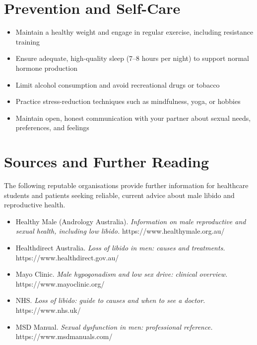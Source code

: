 \section*{Prevention and Self-Care}
\begin{itemize}
    \item Maintain a healthy weight and engage in regular exercise, including resistance training
    \item Ensure adequate, high-quality sleep (7--8 hours per night) to support normal hormone production
    \item Limit alcohol consumption and avoid recreational drugs or tobacco
    \item Practice stress-reduction techniques such as mindfulness, yoga, or hobbies
    \item Maintain open, honest communication with your partner about sexual needs, preferences, and feelings
\end{itemize}

\section*{Sources and Further Reading}
The following reputable organisations provide further information for healthcare students and patients seeking reliable, current advice about male libido and reproductive health.

\begin{itemize}
    \item Healthy Male (Andrology Australia). \textit{Information on male reproductive and sexual health, including low libido.} https://www.healthymale.org.au/
    \item Healthdirect Australia. \textit{Loss of libido in men: causes and treatments.} https://www.healthdirect.gov.au/
    \item Mayo Clinic. \textit{Male hypogonadism and low sex drive: clinical overview.} https://www.mayoclinic.org/
    \item NHS. \textit{Loss of libido: guide to causes and when to see a doctor.} https://www.nhs.uk/
    \item MSD Manual. \textit{Sexual dysfunction in men: professional reference.} https://www.msdmanuals.com/
\end{itemize}
